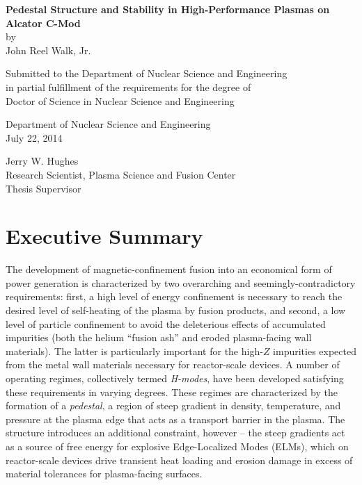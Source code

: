 \documentclass[ twoside,openright,titlepage,numbers=noenddot,headinclude,%
                footinclude=true,cleardoublepage=empty,abstractoff, %
                BCOR=5mm,paper=letter,fontsize=11pt,%
                ngerman,american,%
                ]{scrreprt}
\begin{document}
\frenchspacing
\raggedbottom
{}
\pagestyle{plain}

\let\cleardoublepage\relax
\begin{center}{\large{\bf Pedestal Structure and Stability in High-Performance Plasmas on Alcator C-Mod} \\
by \\
John Reel Walk, Jr. \\[\baselineskip]}
\par
Submitted to the Department of Nuclear Science and Engineering \\
in partial fulfillment of the requirements for the degree of \\
Doctor of Science in Nuclear Science and Engineering
\end{center}
\par
{}\baselineskip
\signature{Author}{Department of Nuclear Science and Engineering \\ July 22, 2014}
\par
{}\baselineskip
\signature{Certified by}{Jerry W. Hughes \\ Research Scientist, Plasma Science and Fusion Center \\ Thesis Supervisor}
\par
{}\baselineskip

\chapter*{Executive Summary}

The development of magnetic-confinement fusion into an economical form of power generation is characterized by two overarching and seemingly-contradictory requirements: first, a high level of energy confinement is necessary to reach the desired level of self-heating of the plasma by fusion products, and second, a low level of particle confinement to avoid the deleterious effects of accumulated impurities (both the helium ``fusion ash'' and eroded plasma-facing wall materials).  The latter is particularly important for the high-$Z$ impurities expected from the metal wall materials necessary for reactor-scale devices.  A number of operating regimes, collectively termed \emph{H-modes}, have been developed satisfying these requirements in varying degrees.  These regimes are characterized by the formation of a \emph{pedestal}, a region of steep gradient in density, temperature, and pressure at the plasma edge that acts as a transport barrier in the plasma.  The structure introduces an additional constraint, however -- the steep gradients act as a source of free energy for explosive Edge-Localized Modes (ELMs), which on reactor-scale devices drive transient heat loading and erosion damage in excess of material tolerances for plasma-facing surfaces.
\end{document}
